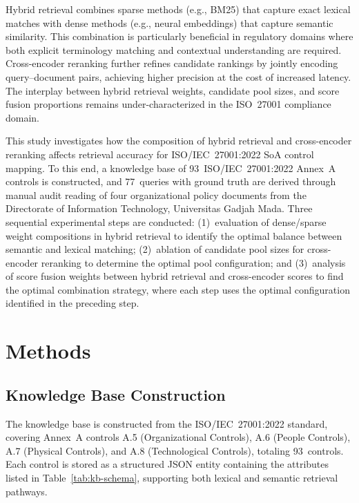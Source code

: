 \documentclass[conference]{IEEEtran}
\begin{document}
Hybrid retrieval combines sparse methods (e.g., BM25) that capture exact
lexical matches with dense methods (e.g., neural embeddings) that capture
semantic similarity. This combination is particularly beneficial in
regulatory domains where both explicit terminology matching and contextual
understanding are required. Cross-encoder reranking further refines
candidate rankings by jointly encoding query--document pairs, achieving
higher precision at the cost of increased latency. The interplay between
hybrid retrieval weights, candidate pool sizes, and score fusion proportions
remains under-characterized in the ISO~27001 compliance domain.

This study investigates how the composition of hybrid retrieval and
cross-encoder reranking affects retrieval accuracy for ISO/IEC~27001:2022
SoA control mapping. To this end, a knowledge base of 93~ISO/IEC~27001:2022
Annex~A controls is constructed, and 77~queries with ground truth are
derived through manual audit reading of four organizational policy documents
from the Directorate of Information Technology, Universitas Gadjah Mada.
Three sequential experimental steps are conducted: (1)~evaluation of
dense/sparse weight compositions in hybrid retrieval to identify the optimal
balance between semantic and lexical matching; (2)~ablation of candidate
pool sizes for cross-encoder reranking to determine the optimal pool
configuration; and (3)~analysis of score fusion weights between hybrid
retrieval and cross-encoder scores to find the optimal combination strategy,
where each step uses the optimal configuration identified in the preceding
step.

\section{Methods}

\subsection{Knowledge Base Construction}

The knowledge base is constructed from the ISO/IEC~27001:2022 standard,
covering Annex~A controls A.5 (Organizational Controls), A.6 (People
Controls), A.7 (Physical Controls), and A.8 (Technological Controls),
totaling 93~controls. Each control is stored as a structured JSON
entity containing the attributes listed in Table~\ref{tab:kb-schema},
supporting both lexical and semantic retrieval pathways.
\end{document}
